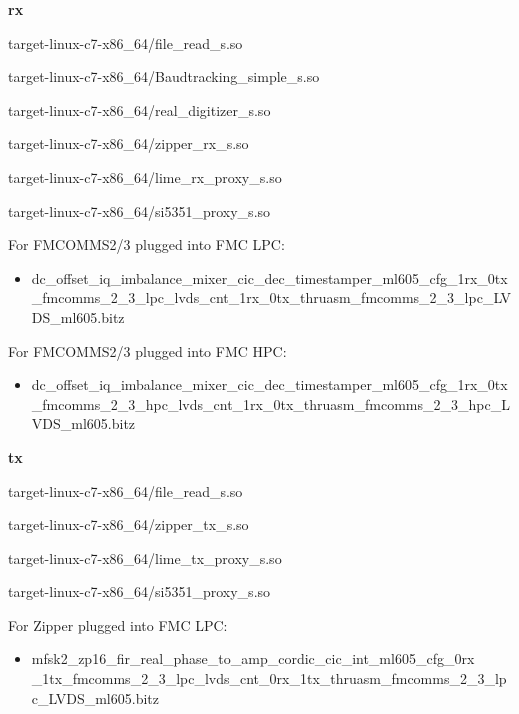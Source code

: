 	\noindent\textbf{rx}
	\begin{itemize}
	\begin{minipage}[t]{.5\textwidth}
	\item target-linux-c7-x86\_64/file\_read\_s.so
	\item target-linux-c7-x86\_64/Baudtracking\_simple\_s.so
	\item target-linux-c7-x86\_64/real\_digitizer\_s.so
	\end{minipage}
	\begin{minipage}[t]{.5\textwidth}
	\item target-linux-c7-x86\_64/zipper\_rx\_s.so
	\item target-linux-c7-x86\_64/lime\_rx\_proxy\_s.so
	\item target-linux-c7-x86\_64/si5351\_proxy\_s.so
	\end{minipage}
	\end{itemize}
	\noindent For FMCOMMS2/3 plugged into FMC LPC:
	\begin{itemize}
	\item dc\_offset\_iq\_imbalance\_mixer\_cic\_dec\_timestamper\_ml605\_cfg\_1rx\_0tx \\
\_fmcomms\_2\_3\_lpc\_lvds\_cnt\_1rx\_0tx\_thruasm\_fmcomms\_2\_3\_lpc\_LVDS\_ml605.bitz
	\end{itemize}
	\noindent For FMCOMMS2/3 plugged into FMC HPC:
	\begin{itemize}
	\item dc\_offset\_iq\_imbalance\_mixer\_cic\_dec\_timestamper\_ml605\_cfg\_1rx\_0tx \\
\_fmcomms\_2\_3\_hpc\_lvds\_cnt\_1rx\_0tx\_thruasm\_fmcomms\_2\_3\_hpc\_LVDS\_ml605.bitz
	\end{itemize}
	
	\noindent\textbf{tx}
	\begin{itemize}
	\begin{minipage}[t]{.5\textwidth}
	\item target-linux-c7-x86\_64/file\_read\_s.so
	\item target-linux-c7-x86\_64/zipper\_tx\_s.so
	\end{minipage}
	\begin{minipage}[t]{.5\textwidth}
	\item target-linux-c7-x86\_64/lime\_tx\_proxy\_s.so
	\item target-linux-c7-x86\_64/si5351\_proxy\_s.so
	\end{minipage}
	\end{itemize}
	For Zipper plugged into FMC LPC:
	\begin{itemize}
		\item mfsk2\_zp16\_fir\_real\_phase\_to\_amp\_cordic\_cic\_int\_ml605\_cfg\_0rx\\
\_1tx\_fmcomms\_2\_3\_lpc\_lvds\_cnt\_0rx\_1tx\_thruasm\_fmcomms\_2\_3\_lpc\_LVDS\_ml605.bitz
	\end{itemize}

